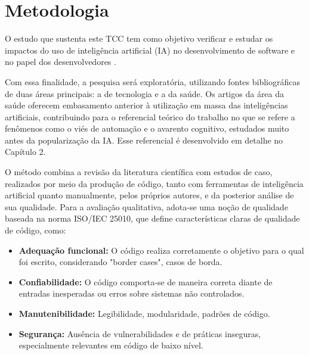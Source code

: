 \chapter{Metodologia}
 
O estudo que sustenta este TCC tem como objetivo verificar e estudar os 
impactos do uso de inteligência artificial (IA) no desenvolvimento de software e no papel dos desenvolvedores .  

Com essa finalidade, a pesquisa será exploratória, utilizando fontes 
bibliográficas de duas áreas principais: a de tecnologia e a da saúde. Os artigos da 
área da saúde oferecem embasamento anterior à utilização em massa das 
inteligências artificiais, contribuindo para o referencial teórico do trabalho no que se 
refere a fenômenos como o viés de automação e o avarento cognitivo, estudados 
muito antes da popularização da IA. Esse referencial é desenvolvido em detalhe no 
Capítulo 2.

O método combina a revisão da literatura científica com estudos de caso, 
realizados por meio da produção de código, tanto com ferramentas de inteligência 
artificial quanto manualmente, pelos próprios autores, e da posterior análise de sua 
qualidade. Para a avaliação qualitativa, adota-se uma noção de qualidade baseada 
na norma ISO/IEC 25010, que define características claras de qualidade de código, 
como:
\begin{itemize}
    \item \textbf{Adequação funcional:} O código realiza corretamente o objetivo para o qual foi escrito, considerando "border cases", casos de borda.
    
    \item \textbf{Confiabilidade:} O código comporta-se de maneira correta diante de entradas inesperadas ou erros sobre sistemas não controlados.
    
    \item \textbf{Manutenibilidade:} Legibilidade, modularidade, padrões de código.
    
    \item \textbf{Segurança:} Ausência de vulnerabilidades e de práticas inseguras, especialmente relevantes em código de baixo nível.
\end{itemize}

